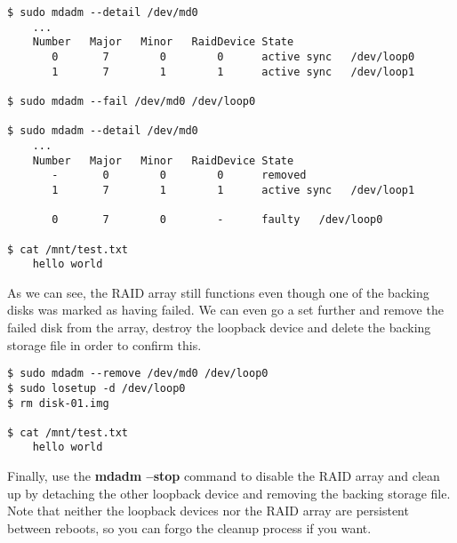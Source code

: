 \begin{lstlisting}[style=bashstyle]
$ sudo mdadm --detail /dev/md0
    ...
    Number   Major   Minor   RaidDevice State
       0       7        0        0      active sync   /dev/loop0
       1       7        1        1      active sync   /dev/loop1

$ sudo mdadm --fail /dev/md0 /dev/loop0

$ sudo mdadm --detail /dev/md0
    ...
    Number   Major   Minor   RaidDevice State
       -       0        0        0      removed
       1       7        1        1      active sync   /dev/loop1

       0       7        0        -      faulty   /dev/loop0

$ cat /mnt/test.txt
    hello world
\end{lstlisting}

As we can see, the RAID array still functions even though one of the backing
disks was marked as having failed. We can even go a set further and remove the
failed disk from the array, destroy the loopback device and delete the backing
storage file in order to confirm this.

\begin{lstlisting}[style=bashstyle]
$ sudo mdadm --remove /dev/md0 /dev/loop0
$ sudo losetup -d /dev/loop0
$ rm disk-01.img

$ cat /mnt/test.txt
    hello world
\end{lstlisting}

Finally, use the \textbf{mdadm --stop} command to disable the RAID array and
clean up by detaching the other loopback device and removing the backing storage
file. Note that neither the loopback devices nor the RAID array are persistent
between reboots, so you can forgo the cleanup process if you want.

